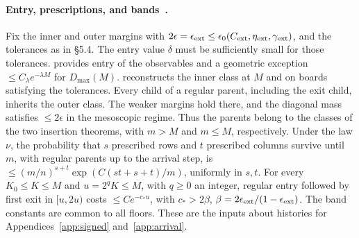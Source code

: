 \paragraph{Entry, prescriptions, and bands~\cite[\S5, Lemmas 5.2, 5.7 and Prop.~5.6, 5.8]{tc}.} Fix the
inner and outer margins with \(2\epsilon=\epsilon_{\rm ext}\le\epsilon_0(C_{\rm ext},\eta_{\rm
ext},\gamma_{\rm ext})\), and the tolerances as in §5.4. The entry value \(\delta\) must be sufficiently
small for those tolerances. \cite[Lemma~5.7]{tc} provides entry of the observables and a geometric exception
\(\le C_\lambda e^{-\lambda M}\) for \(D_{\max}(M)\). \cite[Prop.~5.6]{tc} reconstructs the inner class at
\(M\) and on boards satisfying the tolerances. Every child of a regular parent, including the exit child,
inherits the outer class. The weaker margins hold there, and the diagonal mass satisfies \(\le2\epsilon\) in
the mesoscopic regime. Thus the parents belong to the classes of the two insertion theorems, with \(m>M\)
and \(m\le M\), respectively. Under the law \(\nu\), the probability that \(s\) prescribed rows and \(t\)
prescribed columns survive until \(m\), with regular parents up to the arrival step, is
\(\le(m/n)^{s+t}\exp(C(st+s+t)/m)\), uniformly in \(s,t\). For every \(K_0\le K\le M\) and \(u=2^qK\le
M\), with \(q\ge0\) an integer, regular entry followed by first exit in \([u,2u)\) costs \(\le C
e^{-c_*u}\), with \(c_*>2\beta\), \(\beta=2\epsilon_{\rm ext}/(1-\epsilon_{\rm ext})\). The band
constants are common to all floors. These are the inputs about histories for Appendices~\ref{app:signed}
and~\ref{app:arrival}.



